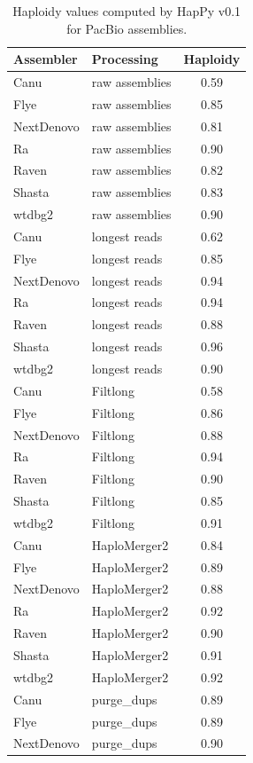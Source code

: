 \begin{table}[ht]
\centering
\caption{Haploidy values computed by HapPy v0.1 for PacBio assemblies.}
\begin{adjustbox}{totalheight=\baselineskip}
\begin{tabular}{llc}
\hline
\textbf{Assembler} & \textbf{Processing} & \textbf{Haploidy} \\
\hline
Canu & raw assemblies & 0.59 \\
Flye & raw assemblies & 0.85 \\
NextDenovo & raw assemblies & 0.81 \\
Ra & raw assemblies & 0.90 \\
Raven & raw assemblies & 0.82 \\
Shasta & raw assemblies & 0.83 \\
wtdbg2 & raw assemblies & 0.90 \\
Canu & longest reads & 0.62 \\
Flye & longest reads & 0.85 \\
NextDenovo & longest reads & 0.94 \\
Ra & longest reads & 0.94 \\
Raven & longest reads & 0.88 \\
Shasta & longest reads & 0.96 \\
wtdbg2 & longest reads & 0.90 \\
Canu & Filtlong & 0.58 \\
Flye & Filtlong & 0.86 \\
NextDenovo & Filtlong & 0.88 \\
Ra & Filtlong & 0.94 \\
Raven & Filtlong & 0.90 \\
Shasta & Filtlong & 0.85 \\
wtdbg2 & Filtlong & 0.91 \\
Canu & HaploMerger2 & 0.84 \\
Flye & HaploMerger2 & 0.89 \\
NextDenovo & HaploMerger2 & 0.88 \\
Ra & HaploMerger2 & 0.92 \\
Raven & HaploMerger2 & 0.90 \\
Shasta & HaploMerger2 & 0.91 \\
wtdbg2 & HaploMerger2 & 0.92 \\
Canu & purge\_dups & 0.89 \\
Flye & purge\_dups & 0.89 \\
NextDenovo & purge\_dups & 0.90 \\

\end{tabular}
\end{adjustbox}
\end{table}
